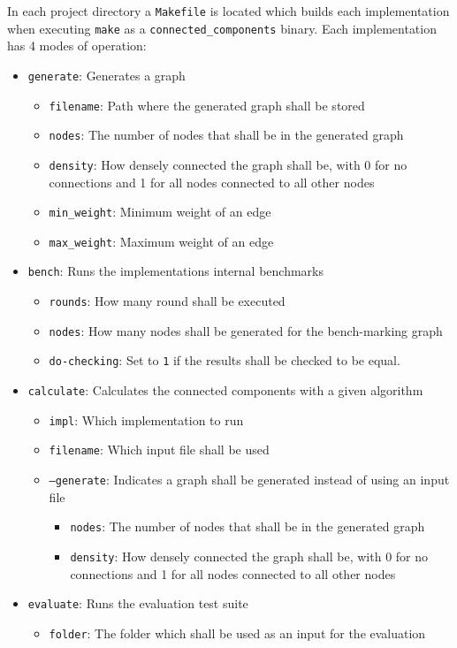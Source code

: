 \documentclass[letta4 paper]{article}
\numberwithin{equation}{section}
\newcommand{\0}{\mathbf{0}}
\begin{document}
In each project directory a \texttt{Makefile} is located which builds each implementation when executing \texttt{make} as a \texttt{connected\_components} binary. Each implementation has 4 modes of operation:
\begin{itemize}
    \item \texttt{generate}: Generates a graph
        \begin{itemize}
            \item \texttt{filename}: Path where the generated graph shall be stored
            \item \texttt{nodes}: The number of nodes that shall be in the generated graph
            \item \texttt{density}: How densely connected the graph shall be, with 0 for no connections and 1 for all nodes connected to all other nodes
            \item \texttt{min\_weight}: Minimum weight of an edge
            \item \texttt{max\_weight}: Maximum weight of an edge
        \end{itemize}
    \item \texttt{bench}: Runs the implementations internal benchmarks
        \begin{itemize}
            \item \texttt{rounds}: How many round shall be executed
            \item \texttt{nodes}: How many nodes shall be generated for the bench-marking graph
            \item \texttt{do-checking}: Set to \texttt{1} if the results shall be checked to be equal.
        \end{itemize}
    \item \texttt{calculate}: Calculates the connected components with a given algorithm 
        \begin{itemize}
            \item \texttt{impl}: Which implementation to run
            \item \texttt{filename}: Which input file shall be used
            \item \texttt{--generate}: Indicates a graph shall be generated instead of using an input file
                \begin{itemize}
                    \item \texttt{nodes}: The number of nodes that shall be in the generated graph
                    \item \texttt{density}: How densely connected the graph shall be, with 0 for no connections and 1 for all nodes connected to all other nodes
            \end{itemize}
        \end{itemize}
    \item \texttt{evaluate}: Runs the evaluation test suite
        \begin{itemize}
            \item \texttt{folder}: The folder which shall be used as an input for the evaluation
        \end{itemize}
\end{itemize}
\end{document}
